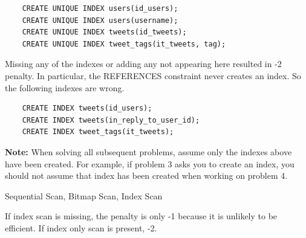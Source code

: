 \documentclass[12pt]{exam}
\theoremstyle{definition}
\begin{document}
\begin{questions}

\begin{solution}
    \begin{lstlisting}
    CREATE UNIQUE INDEX users(id_users);
    CREATE UNIQUE INDEX users(username);
    CREATE UNIQUE INDEX tweets(id_tweets);
    CREATE UNIQUE INDEX tweet_tags(it_tweets, tag);
    \end{lstlisting}
    Missing any of the indexes or adding any not appearing here resulted in -2 penalty.
    In particular, the REFERENCES constraint never creates an index.
    So the following indexes are wrong.
    \begin{lstlisting}
    CREATE INDEX tweets(id_users);
    CREATE INDEX tweets(in_reply_to_user_id);
    CREATE INDEX tweet_tags(it_tweets);
    \end{lstlisting}
\end{solution}

    \textbf{Note:}
    When solving all subsequent problems,
    assume only the indexes above have been created.
    For example, if problem 3 asks you to create an index,
    you should not assume that index has been created when working on problem 4.

\newpage
{}

\begin{solution}
    Sequential Scan,
    Bitmap Scan,
    Index Scan

    If index scan is missing, the penalty is only -1 because it  is unlikely to be efficient.
    If index only scan is present, -2.

\end{solution}

%
%


\end{questions}
\end{document}
